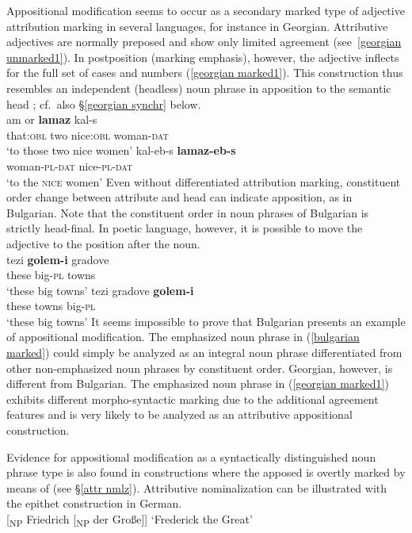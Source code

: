 Appositional modification seems to occur as a secondary marked type of adjective attribution marking in several languages, for instance in Georgian. Attributive adjectives are normally preposed and show only limited agreement (see~\ref{georgian unmarked1}). In postposition (marking emphasis), however, the adjective inflects for the full set of cases and numbers (\ref{georgian marked1}). This construction thus resembles an independent (headless) noun phrase in apposition to the semantic head \citep[652, 677]{testelec1998}; cf.~also \S\ref{georgian synchr} below.
\ea
{}\\
\ea
\label{georgian unmarked1}
\gll	am or \textbf{lamaz} kal-s\\
	that:\textsc{obl} two nice:\textsc{obl} woman-\textsc{dat}\\
\glt	‘to those two nice women’
\ex
\label{georgian marked1}
\gll	kal-eb-s \textbf{lamaz-eb-s}\\
	woman-\textsc{pl}-\textsc{dat} nice-\textsc{pl}-\textsc{dat}\\
\glt	‘to the \textsc{nice} women’
\z
\z
Even without differentiated attribution marking, constituent order change between attribute and head can indicate apposition, as in Bulgarian. Note that the constituent order in noun phrases of Bulgarian is strictly head-final. In poetic language, however, it is possible to move the adjective to the position after the noun.
\ea
{}\\
\ea
\gll	tezi \textbf{golem-i} gradove\\
	these big-\textsc{pl} towns\\
\glt	‘these big towns’
\ex
\label{bulgarian marked}
\gll	tezi gradove \textbf{golem-i}\\
	these towns big-\textsc{pl}\\
\glt	‘these big towns’
\z
\z
It seems impossible to prove that Bulgarian presents an example of appositional modification. The emphasized noun phrase in (\ref{bulgarian marked}) could simply be analyzed as an integral noun phrase differentiated from other non-emphasized noun phrases by constituent order. Georgian, however, is different from Bulgarian. The emphasized noun phrase in (\ref{georgian marked1}) exhibits different morpho-syntactic marking due to the additional agreement features and is very likely to be analyzed as an attributive appositional construction.

Evidence for appositional modification as a syntactically distinguished noun phrase type is also found in constructions where the apposed  is overtly marked by means of  (see \S\ref{attr nmlz}). Attributive nominalization can be illustrated with the epithet construction in German.
\ea 
{}\\
{\upshape [}\textsubscript{\rm NP} Friedrich {\upshape [}\textsubscript{\rm NP} der Große{\upshape ]]} {\rm ‘Frederick the Great’}
\z
{}
